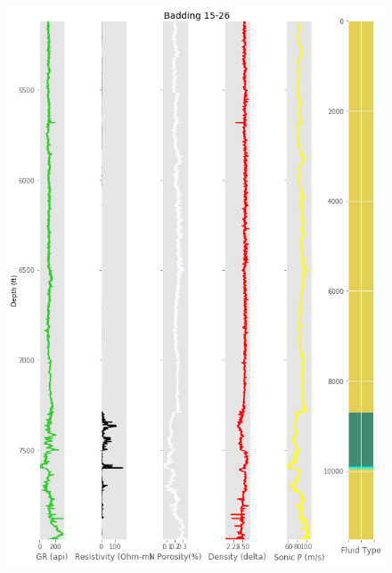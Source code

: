 \documentclass[11pt, a4paper]{article}
\begin{document}
\begin{figure}[h!]
  \includegraphics[width=\linewidth]{w3}
\end{figure}
\end{document}
